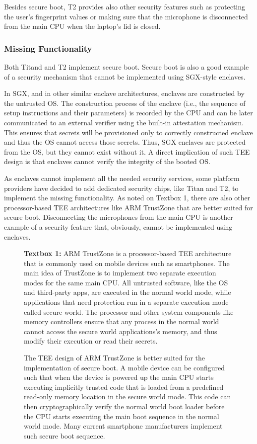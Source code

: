 Besides secure boot, T2 provides also other security features such as protecting the user’s fingerprint values or making sure that the microphone is disconnected from the main CPU when the laptop’s lid is closed. 
 
 
\subsubsection*{Missing Functionality}
  
Both Titand and T2 implement secure boot. Secure boot is also a good example of a security mechanism that cannot be implemented using SGX-style enclaves. 

In SGX, and in other similar enclave architectures, enclaves are constructed by the untrusted OS. The construction process of the enclave (i.e., the sequence of setup instructions and their parameters) is recorded by the CPU and can be later communicated to an external verifier using the built-in attestation mechanism. This ensures that secrets will be provisioned only to correctly constructed enclave and thus the OS cannot access those secrets. Thus, SGX enclaves are protected from the OS, but they cannot exist without it. A direct implication of such TEE design is that enclaves cannot verify the integrity of the booted OS. 

As enclaves cannot implement all the needed security services, some platform providers have decided to add dedicated security chips, like Titan and T2, to implement the missing functionality. As noted on Textbox 1, there are also other processor-based TEE architectures like ARM TrustZone that are better suited for secure boot.
%
Disconnecting the microphones from the main CPU is another example of a security feature that, obviously, cannot be implemented using enclaves.
  

\begin{figure}
	\begin{tcolorbox}
	\textbf{Textbox 1:} ARM TrustZone is a processor-based TEE architecture that is commonly used on mobile devices such as smartphones. The main idea of TrustZone is to implement two separate execution modes for the same main CPU. All untrusted software, like the OS and third-party apps, are executed in the normal world mode, while applications that need protection run in a separate execution mode called secure world. The processor and other system components like memory controllers ensure that any process in the normal world cannot access the secure world applications’s memory, and thus modify their execution or read their secrets.

	The TEE design of ARM TrustZone is better suited for the implementation of secure boot. A mobile device can be configured such that when the device is powered up the main CPU starts executing implicitly trusted code that is loaded from a predefined read-only memory location in the secure world mode. This code can then cryptographically verify the normal world boot loader before the CPU starts executing the main boot sequence in the normal world mode. Many current smartphone manufacturers implement such secure boot sequence.
	\end{tcolorbox}
\end{figure}  


